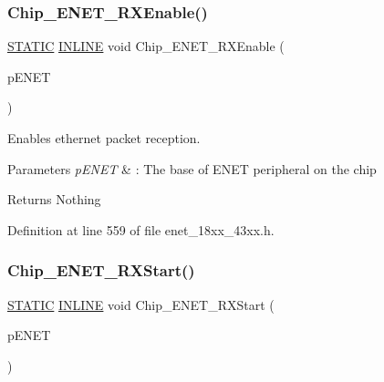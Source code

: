 \subsubsection{\texorpdfstring{Chip\+\_\+\+E\+N\+E\+T\+\_\+\+R\+X\+Enable()}{Chip\_ENET\_RXEnable()}}
{\footnotesize\ttfamily \hyperlink{group___l_p_c___types___public___macros_ga10b2d890d871e1489bb02b7e70d9bdfb}{S\+T\+A\+T\+IC} \hyperlink{spifi__18xx__43xx_8h_a2eb6f9e0395b47b8d5e3eeae4fe0c116}{I\+N\+L\+I\+NE} void Chip\+\_\+\+E\+N\+E\+T\+\_\+\+R\+X\+Enable (\begin{DoxyParamCaption}\item[{\hyperlink{struct_l_p_c___e_n_e_t___t}{L\+P\+C\+\_\+\+E\+N\+E\+T\+\_\+T} $\ast$}]{p\+E\+N\+ET }\end{DoxyParamCaption})}



Enables ethernet packet reception. 


\begin{DoxyParams}{Parameters}
{\em p\+E\+N\+ET} & \+: The base of E\+N\+ET peripheral on the chip \\
\hline
\end{DoxyParams}
\begin{DoxyReturn}{Returns}
Nothing 
\end{DoxyReturn}


Definition at line 559 of file enet\+\_\+18xx\+\_\+43xx.\+h.

\mbox{\label{group___e_n_e_t__18_x_x__43_x_x_ga1c12c6420ce2ddf9db02cae9a6a85cd5}} 
\subsubsection{\texorpdfstring{Chip\+\_\+\+E\+N\+E\+T\+\_\+\+R\+X\+Start()}{Chip\_ENET\_RXStart()}}
{\footnotesize\ttfamily \hyperlink{group___l_p_c___types___public___macros_ga10b2d890d871e1489bb02b7e70d9bdfb}{S\+T\+A\+T\+IC} \hyperlink{spifi__18xx__43xx_8h_a2eb6f9e0395b47b8d5e3eeae4fe0c116}{I\+N\+L\+I\+NE} void Chip\+\_\+\+E\+N\+E\+T\+\_\+\+R\+X\+Start (\begin{DoxyParamCaption}\item[{\hyperlink{struct_l_p_c___e_n_e_t___t}{L\+P\+C\+\_\+\+E\+N\+E\+T\+\_\+T} $\ast$}]{p\+E\+N\+ET }\end{DoxyParamCaption})}



